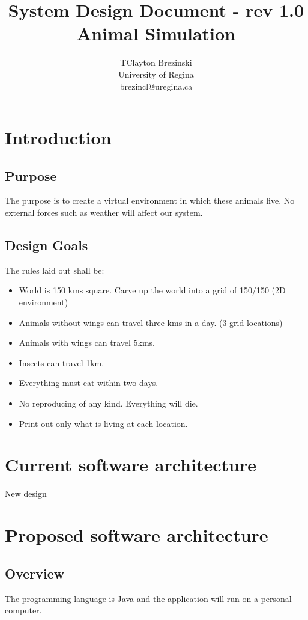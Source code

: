 \documentclass[11pt]{article}
\title{System Design Document - rev 1.0\\
 Animal Simulation}
\author{TClayton Brezinski\\
University of Regina\\
brezincl@uregina.ca}
\begin{document}
         
\maketitle

\section{Introduction}
\subsection{Purpose}
The purpose is to create a virtual environment in which these animals live.  No external forces such as weather will affect our system.
\subsection{Design Goals}
The rules laid out shall be:
\begin{itemize}
  \item World is 150 kms square.  Carve up the world into a grid of 150/150 (2D environment)
  \item Animals without wings can travel three kms in a day. (3 grid locations)
  \item Animals with wings can travel 5kms. 
  \item Insects can travel 1km.
  \item Everything must eat within two days.
  \item No reproducing of any kind.  Everything will die.
  \item Print out only what is living at each location.
\end{itemize}

\section{Current software architecture}
New design

\section{ Proposed software architecture}
\subsection{Overview}
The programming language is Java and the application will run on a personal computer.
\end{document}
